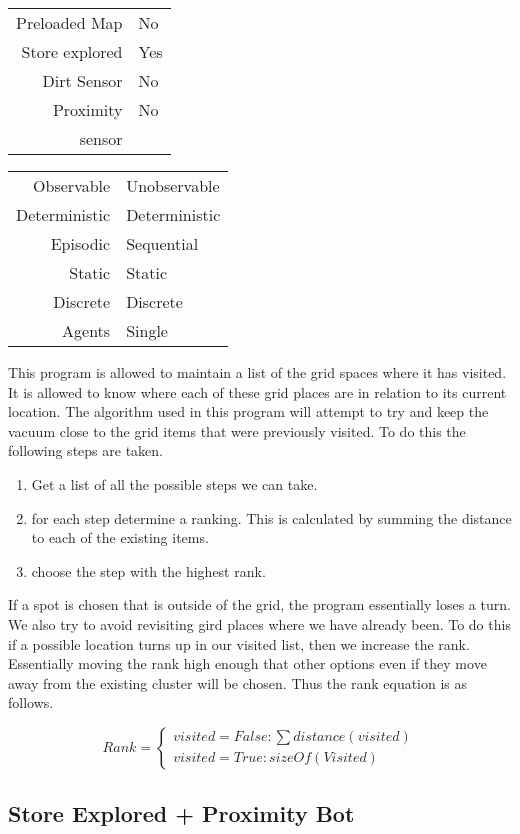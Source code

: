 \documentclass[letterpaper]{article}
\begin{document}
\begin{tabular}{ r | l }  
	Preloaded Map 		& No \\
	Store explored 		& Yes \\
	Dirt Sensor 		& No \\
	Proximity 		 	& No \\
	sensor 					 \\
\end{tabular}
\quad
\begin{tabular}{ r | l }  
	Observable 		& Unobservable 	\\
	Deterministic 	& Deterministic \\
	Episodic		& Sequential	\\
	Static		 	& Static 		\\
	Discrete 		& Discrete 		\\
	Agents		 	& Single 		\\	
\end{tabular}
This program is allowed to maintain a list of the grid spaces where it has visited.  It is allowed to know where each of these grid places are in relation to its current location.
The algorithm used in this program will attempt to try and keep the vacuum close to the grid items that were previously visited.  To do this the following steps are taken.  
\begin{enumerate}  
\item Get a list of all the possible steps we can take.
\item for each step determine a ranking.  This is calculated by summing the distance to each of the existing items.
\item choose the step with the highest rank.
\end{enumerate}

If a spot is chosen that is outside of the grid, the program essentially loses a turn.  We also try to avoid revisiting gird places where we have already been.  To do this if a possible location turns up in our visited list, then we increase the rank.  Essentially moving the rank high enough that other options even if they move away from the existing cluster will be chosen.  Thus the rank equation is as follows.

\[
  Rank=
	\begin{cases}
		visited=False: \sum{distance(visited)}\\
		visited=True: sizeOf(Visited)
	\end{cases}
\]

\subsection{Store Explored + Proximity Bot}
\end{document}
